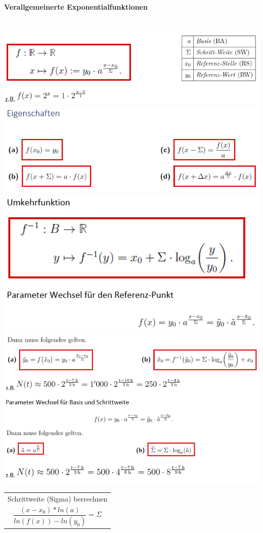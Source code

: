 \paragraph{Verallgemeinerte Exponentialfunktionen}\mbox{}\\
\noindent
\includegraphics[width=\columnwidth]{./images/expo.png}
\includegraphics[width=\columnwidth]{./images/expo1.png}
\includegraphics[width=\columnwidth]{./images/expo2.png}
\includegraphics[width=\columnwidth]{./images/expo3.png}
\begin{tabularx}{\columnwidth}{@{}X@{}}
    \hline
    Schrittweite (Sigma) berrechnen                       \\
    \[ \frac{(x-x_0)*ln(a)}{ln(f(x))-ln(y_0)} = \Sigma \] \\ \hline
\end{tabularx}
\vspace{1mm}

